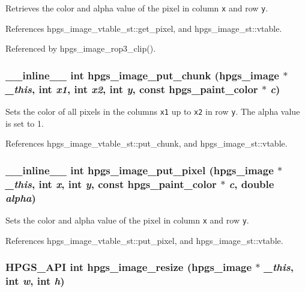 Retrieves the color and alpha value of the pixel in column {\tt x} and row {\tt y}. 

References hpgs\_\-image\_\-vtable\_\-st::get\_\-pixel, and hpgs\_\-image\_\-st::vtable.

Referenced by hpgs\_\-image\_\-rop3\_\-clip().
\subsubsection[hpgs\_\-image\_\-put\_\-chunk]{\setlength{\rightskip}{0pt plus 5cm}\_\-\_\-inline\_\-\_\- int hpgs\_\-image\_\-put\_\-chunk ({\bf hpgs\_\-image} $\ast$ {\em \_\-this}, \/  int {\em x1}, \/  int {\em x2}, \/  int {\em y}, \/  const {\bf hpgs\_\-paint\_\-color} $\ast$ {\em c})\hspace{0.3cm}{\tt  [static]}}\label{group__image_g878871bee62b4b1a604263c4d19b7598}


Sets the color of all pixels in the columns {\tt x1} up to {\tt x2} in row {\tt y}. The alpha value is set to 1. 

References hpgs\_\-image\_\-vtable\_\-st::put\_\-chunk, and hpgs\_\-image\_\-st::vtable.
\subsubsection[hpgs\_\-image\_\-put\_\-pixel]{\setlength{\rightskip}{0pt plus 5cm}\_\-\_\-inline\_\-\_\- int hpgs\_\-image\_\-put\_\-pixel ({\bf hpgs\_\-image} $\ast$ {\em \_\-this}, \/  int {\em x}, \/  int {\em y}, \/  const {\bf hpgs\_\-paint\_\-color} $\ast$ {\em c}, \/  double {\em alpha})\hspace{0.3cm}{\tt  [static]}}\label{group__image_gc3e27eb47a6cb869d3d8696b08df1b55}


Sets the color and alpha value of the pixel in column {\tt x} and row {\tt y}. 

References hpgs\_\-image\_\-vtable\_\-st::put\_\-pixel, and hpgs\_\-image\_\-st::vtable.
\subsubsection[hpgs\_\-image\_\-resize]{\setlength{\rightskip}{0pt plus 5cm}HPGS\_\-API int hpgs\_\-image\_\-resize ({\bf hpgs\_\-image} $\ast$ {\em \_\-this}, \/  int {\em w}, \/  int {\em h})}\label{group__image_g74996c0c44f726bce4d32c3260d9eb47}


